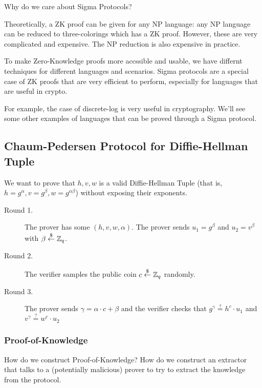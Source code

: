 Why do we care about Sigma Protocols?

Theoretically, a ZK proof can be given for any NP language: any NP language can be reduced to three-colorings which has a ZK proof. However, these are very complicated and expensive. The NP reduction is also expensive in practice.

To make Zero-Knowledge proofs more accssible and usable, we have differnt techniques for different languages and scenarios. Sigma protocols are a special case of ZK proofs that are very efficient to perform, especially for languages that are useful in crypto.

For example, the case of discrete-log is very useful in cryptography. We'll see some other examples of languages that can be proved through a Sigma protocol.

\subsection{Chaum-Pedersen Protocol for Diffie-Hellman Tuple}\label{sec:mar7-cp}
\vspace{1em}
\begin{example}
    We want to prove that $h, v, w$ is a valid Diffie-Hellman Tuple (that is, $h = g^\alpha, v = g^\beta, w = g^{\alpha\beta}$) without exposing their exponents.

    \begin{description}
        \item[Round 1.] The prover has some $(h, v, w, \alpha)$. The prover sends $u_1 = g^\beta$ and $u_2 = v^\beta$ with $\beta\overset{\$}{\leftarrow}\mathbb Z_q$.
        \item[Round 2.] The verifier samples the public coin $c\overset{\$}{\leftarrow} \mathbb Z_q$ randomly.
        \item[Round 3.] The prover sends $\gamma = \alpha\cdot c + \beta$ and the verifier checks that $g^\gamma \overset{?}{=} h^c\cdot u_1$ and $v^\gamma \overset{?}{=} w^c\cdot u_2$
    \end{description}
\end{example}

\subsubsection{Proof-of-Knowledge}

How do we construct Proof-of-Knowledge? How do we construct an extractor that talks to a (potentially malicious) prover to try to extract the knowledge from the protocol.

